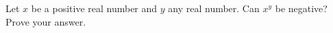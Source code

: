 Let $x$ be a positive real number and $y$ any real number. Can $x^y$ be negative? Prove your answer.
